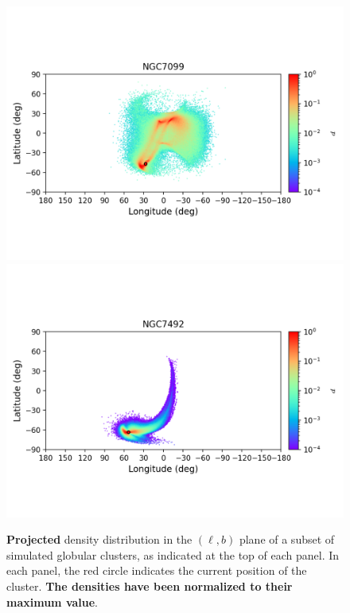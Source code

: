\begin{figure}
        \includegraphics[clip=true, trim = 0mm 20mm 0mm 10mm, width=1\columnwidth]{images/error_plots_NGC7099.png}
        \includegraphics[clip=true, trim = 0mm 20mm 0mm 10mm, width=1\columnwidth]{images/error_plots_NGC7492.png}
        \caption[]{\textbf{Projected} density distribution in the $(\ell, b)$ plane of a subset of simulated globular clusters, as indicated at the top of each panel. In each panel, the red circle indicates the current position of the cluster. \textbf{The densities have been normalized to their maximum value}.}\label{stream16}
        \end{figure}
